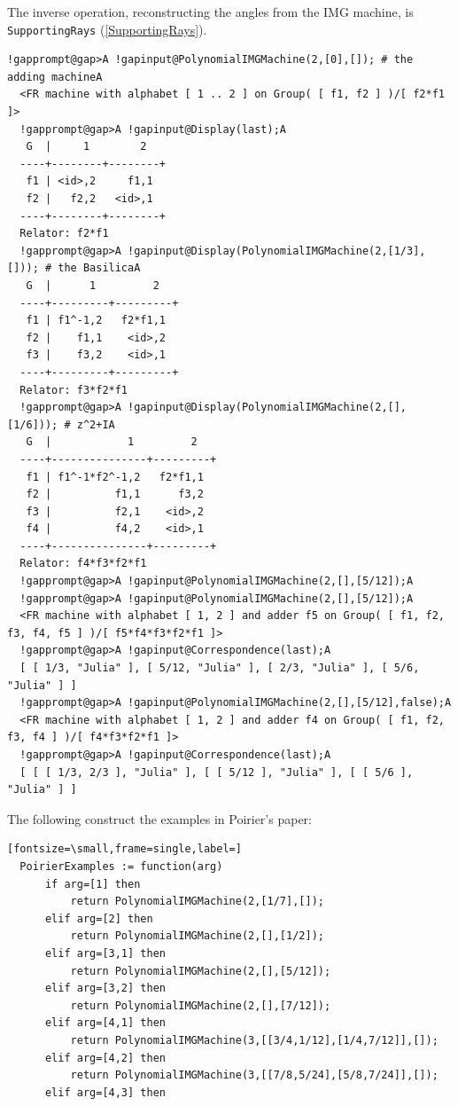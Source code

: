 \documentclass[a4paper,11pt]{report}
\begin{document}
{{{ The inverse operation, reconstructing the angles from the IMG machine, is \texttt{SupportingRays} (\ref{SupportingRays}). 
\begin{Verbatim}[commandchars=!@A,fontsize=\small,frame=single,label=Example]
  !gapprompt@gap>A !gapinput@PolynomialIMGMachine(2,[0],[]); # the adding machineA
  <FR machine with alphabet [ 1 .. 2 ] on Group( [ f1, f2 ] )/[ f2*f1 ]>
  !gapprompt@gap>A !gapinput@Display(last);A
   G  |     1        2
  ----+--------+--------+
   f1 | <id>,2     f1,1
   f2 |   f2,2   <id>,1
  ----+--------+--------+
  Relator: f2*f1
  !gapprompt@gap>A !gapinput@Display(PolynomialIMGMachine(2,[1/3],[])); # the BasilicaA
   G  |      1         2
  ----+---------+---------+
   f1 | f1^-1,2   f2*f1,1
   f2 |    f1,1    <id>,2
   f3 |    f3,2    <id>,1
  ----+---------+---------+
  Relator: f3*f2*f1
  !gapprompt@gap>A !gapinput@Display(PolynomialIMGMachine(2,[],[1/6])); # z^2+IA
   G  |            1         2
  ----+---------------+---------+
   f1 | f1^-1*f2^-1,2   f2*f1,1
   f2 |          f1,1      f3,2
   f3 |          f2,1    <id>,2
   f4 |          f4,2    <id>,1
  ----+---------------+---------+
  Relator: f4*f3*f2*f1
  !gapprompt@gap>A !gapinput@PolynomialIMGMachine(2,[],[5/12]);A
  !gapprompt@gap>A !gapinput@PolynomialIMGMachine(2,[],[5/12]);A
  <FR machine with alphabet [ 1, 2 ] and adder f5 on Group( [ f1, f2, f3, f4, f5 ] )/[ f5*f4*f3*f2*f1 ]>
  !gapprompt@gap>A !gapinput@Correspondence(last);A
  [ [ 1/3, "Julia" ], [ 5/12, "Julia" ], [ 2/3, "Julia" ], [ 5/6, "Julia" ] ]
  !gapprompt@gap>A !gapinput@PolynomialIMGMachine(2,[],[5/12],false);A
  <FR machine with alphabet [ 1, 2 ] and adder f4 on Group( [ f1, f2, f3, f4 ] )/[ f4*f3*f2*f1 ]>
  !gapprompt@gap>A !gapinput@Correspondence(last);A
  [ [ [ 1/3, 2/3 ], "Julia" ], [ [ 5/12 ], "Julia" ], [ [ 5/6 ], "Julia" ] ]
\end{Verbatim}
 The following construct the examples in Poirier's paper: 
\begin{Verbatim}[fontsize=\small,frame=single,label=]
  PoirierExamples := function(arg)
      if arg=[1] then
          return PolynomialIMGMachine(2,[1/7],[]);
      elif arg=[2] then
          return PolynomialIMGMachine(2,[],[1/2]);
      elif arg=[3,1] then
          return PolynomialIMGMachine(2,[],[5/12]);
      elif arg=[3,2] then
          return PolynomialIMGMachine(2,[],[7/12]);
      elif arg=[4,1] then
          return PolynomialIMGMachine(3,[[3/4,1/12],[1/4,7/12]],[]);
      elif arg=[4,2] then
          return PolynomialIMGMachine(3,[[7/8,5/24],[5/8,7/24]],[]);
      elif arg=[4,3] then

\end{Verbatim}}}}
\end{document}
